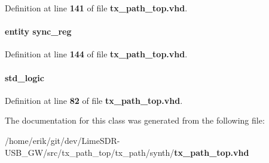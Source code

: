 Definition at line {\bf 141} of file {\bf tx\+\_\+path\+\_\+top.\+vhd}.

\paragraph[{sync\+\_\+reg8}]{ {\bfseries \textcolor{keywordflow}{entity}\textcolor{vhdlchar}{ }\textcolor{vhdlchar}{sync\+\_\+reg}\textcolor{vhdlchar}{ }} \hspace{0.3cm}{\ttfamily [Instantiation]}}\label{classtx__path__top_1_1arch_a0b58a7cce800b7229df5690cd0a3e1c2}


Definition at line {\bf 144} of file {\bf tx\+\_\+path\+\_\+top.\+vhd}.

\paragraph[{trxiqpulse\+\_\+sync\+\_\+iq\+\_\+rdclk}]{ {\bfseries \textcolor{comment}{std\+\_\+logic}\textcolor{vhdlchar}{ }} \hspace{0.3cm}{\ttfamily [Signal]}}\label{classtx__path__top_1_1arch_a3e0e54079c690cba47f2d5df4f94c4f8}


Definition at line {\bf 82} of file {\bf tx\+\_\+path\+\_\+top.\+vhd}.



The documentation for this class was generated from the following file\+:\begin{DoxyCompactItemize}
\item 
/home/erik/git/dev/\+Lime\+S\+D\+R-\/\+U\+S\+B\+\_\+\+G\+W/src/tx\+\_\+path\+\_\+top/tx\+\_\+path/synth/{\bf tx\+\_\+path\+\_\+top.\+vhd}\end{DoxyCompactItemize}
